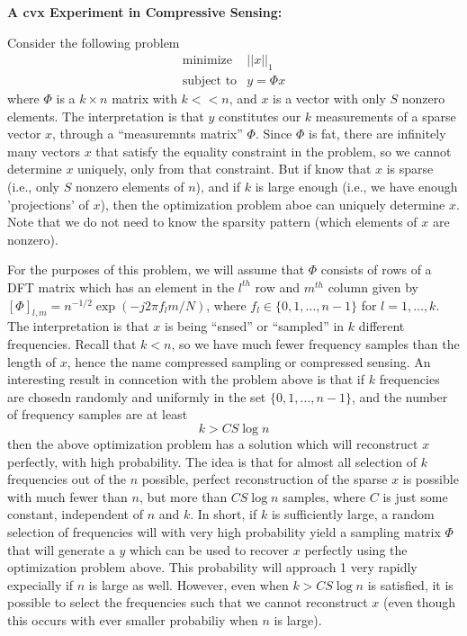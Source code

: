 \begin{prob}[5]\textbf{A cvx Experiment in Compressive Sensing:}
\end{prob}
 Consider the following problem
  \begin{eqnarray*}
    \mbox{minimize} & \vert \vert x \vert \vert_{1}\\
    \mbox{subject to} & y = \Phi x
  \end{eqnarray*}
  where $\Phi$ is a $k \times n$ matrix with $k << n$, and $x$ is a vector
  with only $S$ nonzero elements. The interpretation is that $y$ constitutes
  our $k$ measurements of a sparse vector $x$, through a ``measuremnts
  matrix'' $\Phi$. Since $\Phi$ is fat, there are infinitely many vectors
  $x$ that satisfy the equality constraint in the problem, so we cannot
  determine $x$ uniquely, only from that constraint. But if know that
  $x$ is sparse (i.e., only $S$ nonzero elements of $n$), and if $k$ is
  large enough (i.e., we have enough 'projections' of $x$), then the
  optimization problem aboe can uniquely determine $x$. Note that we
  do not need to know the sparsity pattern (which elements of $x$ are
  nonzero).

  For the purposes of this problem, we will assume that $\Phi$ consists
  of rows of a DFT matrix which has an element in the $l^{th}$ row and
  $m^{th}$ column given by $[ \Phi ]_{l,m} = n^{-1/2}\exp (-j 2 \pi f_{l} m / N)$,
  where $f_{l} \in \{0,1,\ldots,n-1\}$ for $l = 1, \ldots, k$. The
  interpretation is that $x$ is being ``snsed'' or ``sampled'' in $k$
  different frequencies. Recall that $k < n$, so we have much fewer
  frequency samples than the length of $x$, hence the name compressed
  sampling or compressed sensing. An interesting result in conncetion
  with the problem above is that if $k$ frequencies are chosedn randomly
  and uniformly in the set $\{0,1,\ldots,n-1\}$, and the number of
  frequency samples are at least
  \[
  k > CS \log n
  \]
  then the above optimization problem has a solution which will reconstruct
  $x$ perfectly, with high probability. The idea is that for almost all
  selection of $k$ frequencies out of the $n$ possible, perfect reconstruction
  of the sparse $x$ is possible with much fewer than $n$, but more than
  $CS \log n$ samples, where $C$ is just some constant, independent of
  $n$ and $k$. In short, if $k$ is sufficiently large, a random selection of
  frequencies will with very high probability yield a sampling matrix
  $\Phi$ that will generate a $y$ which can be used to recover $x$ perfectly
  using the optimization problem above. This probability will approach 1 very
  rapidly expecially if $n$ is large as well. However, even when $k > CS \log n$
  is satisfied, it is possible to select the frequencies such that we
  cannot reconstruct $x$ (even though this occurs with ever smaller
  probabiliy when $n$ is large).

